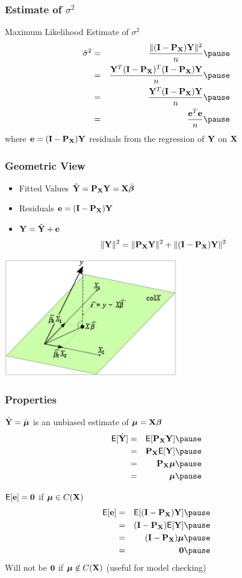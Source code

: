 \documentclass[handout]{beamer}
\begin{document}
\begin{frame}
  \frametitle{Estimate of $\sigma^2$}
  Maximum Likelihood Estimate of $\sigma^2$
  \begin{eqnarray*}
    \shat & = & \frac{\| (\I - \P_\X) \Y \|^2}{n} \pause\\
      & = & \frac{\Y^T(\I - \P_\X)^T(\I-\P_\X) \Y }{n} \pause\\
 & = & \frac{ \Y^T(\I - \P_\X) \Y}{n} \pause\\
 & = & \frac{\e^T\e} {n} \pause
  \end{eqnarray*}
where $\mathbf{e} = (\mathbf{I} - \mathbf{P}_{\mathbf{X}})\mathbf{Y}$  \alert<5>{residuals} from the regression of $\mathbf{Y}$
on $\mathbf{X}$
\end{frame}
\begin{frame}
  \frametitle{Geometric View}
  \begin{itemize}
  \item Fitted Values  $\hat{\mathbf{Y}} = \mathbf{P}_{\mathbf{X}} \mathbf{Y} = \mathbf{X} \hat{\boldsymbol{\beta}}$ \pause
\item Residuals $\mathbf{e} = (\mathbf{I} - \mathbf{P}_{\mathbf{X}}) \mathbf{Y}$ \pause
\item $\mathbf{Y} = \hat{\mathbf{Y}} + \mathbf{e}$ \pause
$$\| \mathbf{Y} \|^2 = \| \mathbf{P}_{\mathbf{X}} \mathbf{Y} \|^2 +  \| (\mathbf{I}- \mathbf{P}_{\mathbf{X}})\mathbf{Y}\|^2  $$ \pause
  \end{itemize}
  \centerline{\includegraphics[height=2in]{OLS}}

\end{frame}

\begin{frame}
  \frametitle{Properties}
 $\hat{\mathbf{Y}} = \hat{\boldsymbol{\mu}}$ is an unbiased estimate of $\boldsymbol{\mu} = \mathbf{X}\boldsymbol{\beta}$
\pause
    \begin{eqnarray*}
      \E [ \Yhat ]  & = & \E [\P_\X \Y ] \pause\\
& = & \P_\X \E[\Y] \pause\\
& = & \P_\X \mub \pause\\
& = & \mub \pause
    \end{eqnarray*}

$\textsf{E}[\mathbf{e}] = \mathbf{0}$ if $\boldsymbol{\mu} \in C(\mathbf{X})$ \pause
\begin{eqnarray*}
      \E [ \e ]  & = & \E [(\I - \P_\X) \Y ] \pause\\
& = & (\I - \P_\X) \E[\Y] \pause\\
& = & (\I - \P_\X) \mub \pause\\
& = & \zero \pause
    \end{eqnarray*}
Will not be $\mathbf{0}$ if $\boldsymbol{\mu} \notin C(\mathbf{X})$  (useful for model checking)

\end{frame}
\end{document}
